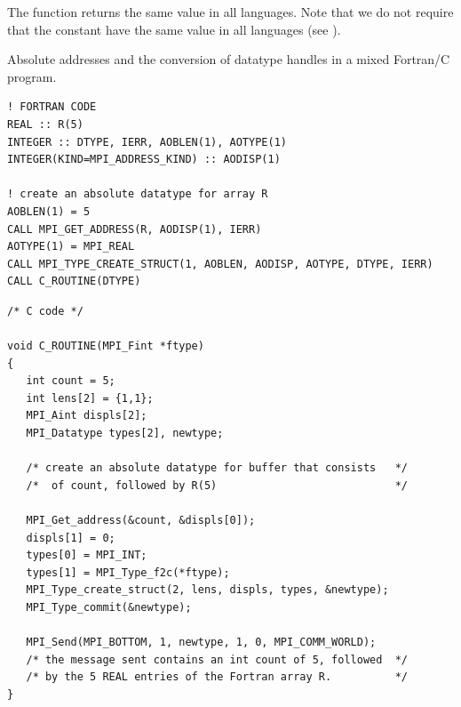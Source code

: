 The function  returns the same value in
all languages.  Note that we do not require that the
constant  have the same value in all languages (see
).

\begin{example}
Absolute addresses and the conversion of datatype handles in a mixed Fortran/C program.
%
\label{sec:misc-interlangcom}
\begin{lstlisting}[language={[MPI]Fortran}]
! FORTRAN CODE
REAL :: R(5)
INTEGER :: DTYPE, IERR, AOBLEN(1), AOTYPE(1)
INTEGER(KIND=MPI_ADDRESS_KIND) :: AODISP(1)

! create an absolute datatype for array R
AOBLEN(1) = 5
CALL MPI_GET_ADDRESS(R, AODISP(1), IERR)
AOTYPE(1) = MPI_REAL
CALL MPI_TYPE_CREATE_STRUCT(1, AOBLEN, AODISP, AOTYPE, DTYPE, IERR)
CALL C_ROUTINE(DTYPE)
\end{lstlisting}

\begin{lstlisting}[language={[MPI]C}]
/* C code */

void C_ROUTINE(MPI_Fint *ftype)
{
   int count = 5;
   int lens[2] = {1,1};
   MPI_Aint displs[2];
   MPI_Datatype types[2], newtype;

   /* create an absolute datatype for buffer that consists   */
   /*  of count, followed by R(5)                            */

   MPI_Get_address(&count, &displs[0]);
   displs[1] = 0;
   types[0] = MPI_INT;
   types[1] = MPI_Type_f2c(*ftype);
   MPI_Type_create_struct(2, lens, displs, types, &newtype);
   MPI_Type_commit(&newtype);

   MPI_Send(MPI_BOTTOM, 1, newtype, 1, 0, MPI_COMM_WORLD);
   /* the message sent contains an int count of 5, followed  */
   /* by the 5 REAL entries of the Fortran array R.          */
}
\end{lstlisting}
\end{example}

